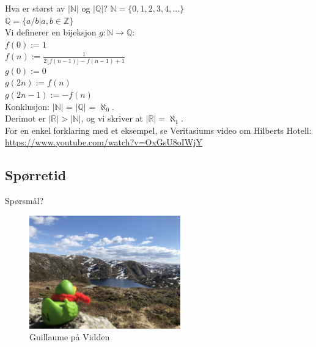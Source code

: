 \begin{frame}{Hva er størst av $|\mathbb{N}|$ og $|\mathbb{Q}|$?}
        $\mathbb{N} = \{0, 1, 2, 3, 4, ...\}$\\
        $\mathbb{Q} = \{a / b | a, b \in \mathbb{Z}\}$\\[2mm]
        \pause
        Vi definerer en bijeksjon $g : \mathbb{N} \rightarrow \mathbb{Q}$:\\
        $f(0) := 1$\\
        $f(n) := \frac{1}{2\lfloor f(n-1) \rfloor - f(n-1)+1}$\\
        $g(0) := 0$\\
        $g(2n) := f(n)$\\
        $g(2n-1) := -f(n)$\\
        Konklusjon: $|\mathbb{N}|$ = $|\mathbb{Q}|$ = $\aleph_0$.\\[2mm]\pause
        Derimot er $|\mathbb{R}| > |\mathbb{N}|$, og vi skriver at $|\mathbb{R}| = \aleph_1$.\\ 
        For en enkel forklaring med et eksempel, se Veritasiums video om Hilberts Hotell: \url{https://www.youtube.com/watch?v=OxGsU8oIWjY}
\end{frame}

\subsection*{Spørretid}
\begin{frame}{Spørsmål?}
    \begin{figure}
        \centering
        \includegraphics[height = 4.9cm]{images/guillaume4.jpg}
        \caption{Guillaume på Vidden}
        \label{fig:guillaume4}
    \end{figure}
\end{frame}